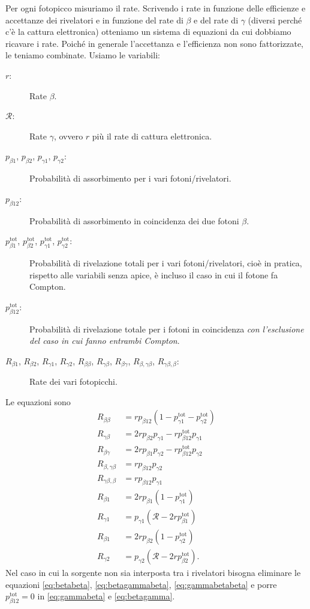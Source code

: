 Per ogni fotopicco misuriamo il rate.
Scrivendo i rate in funzione delle efficienze e accettanze dei rivelatori
e in funzione del rate di $\beta$ e del rate di $\gamma$
(diversi perché c'è la cattura elettronica)
otteniamo un sistema di equazioni da cui dobbiamo ricavare i rate.
Poiché in generale l'accettanza e l'efficienza non sono fattorizzate, le teniamo combinate.
Usiamo le variabili:
\newcommand*\tot{^\text{tot}}
\newcommand*\R{r}
\newcommand*\Rtot{\mathcal{R}}
\begin{description}
	\item[$\R$:]
	Rate $\beta$.
	\item[$\Rtot$:]
	Rate $\gamma$, ovvero $r$ più il rate di cattura elettronica.
	\item[$p_{\beta1}$, $p_{\beta2}$, $p_{\gamma1}$, $p_{\gamma2}$:]
	Probabilità di assorbimento per i vari fotoni/rivelatori.
	\item[$p_{\beta12}$:]
	Probabilità di assorbimento in coincidenza dei due fotoni $\beta$.
	\item[$p_{\beta1}^\text{tot}$, $p_{\beta2}^\text{tot}$, $p_{\gamma1}^\text{tot}$, $p_{\gamma2}^\text{tot}$:]
	Probabilità di rivelazione totali per i vari fotoni/rivelatori,
	cioè in pratica, rispetto alle variabili senza apice, è incluso il caso in cui il fotone fa Compton.
	\item[$p_{\beta12}^\text{tot}$:]
	Probabilità di rivelazione totale per i fotoni in coincidenza
	\emph{con l'esclusione del caso in cui fanno entrambi Compton}.
	\item[$R_{\beta1}$, $R_{\beta2}$, $R_{\gamma1}$, $R_{\gamma2}$, $R_{\beta\beta}$, $R_{\gamma\beta}$, $R_{\beta\gamma}$, $R_{\beta,\gamma\beta}$, $R_{\gamma\beta,\beta}$:]
	Rate dei vari fotopicchi.
\end{description}
Le equazioni sono
\begin{align}
	R_{\beta\beta} \label{eq:betabeta}
	&= \R p_{\beta12} (1 - p_{\gamma1}\tot - p_{\gamma2}\tot) \\
	R_{\gamma\beta} \label{eq:gammabeta}
	&= 2\R p_{\beta2} p_{\gamma1} - \R p_{\beta12}\tot p_{\gamma1} \\
	R_{\beta\gamma} \label{eq:betagamma}
	&= 2\R p_{\beta1} p_{\gamma2} - \R p_{\beta12}\tot p_{\gamma2} \\
	R_{\beta,\gamma\beta} \label{eq:betagammabeta}
	&= \R p_{\beta12} p_{\gamma2} \\
	R_{\gamma\beta,\beta} \label{eq:gammabetabeta}
	&= \R p_{\beta12} p_{\gamma1} \\
	R_{\beta1}
	&= 2\R p_{\beta1} (1 - p_{\gamma1}\tot) \\
	R_{\gamma1} \label{eq:gamma1}
	&= p_{\gamma1}(\Rtot - 2 \R p_{\beta1}\tot) \\
	R_{\beta1}
	&= 2\R p_{\beta2} (1 - p_{\gamma2}\tot) \\
	R_{\gamma2} \label{eq:gamma2}
	&= p_{\gamma2} (\Rtot  - 2 \R p_{\beta2}\tot).
\end{align}
Nel caso in cui la sorgente non sia interposta tra i rivelatori
bisogna eliminare le equazioni \eqref{eq:betabeta}, \eqref{eq:betagammabeta}, \eqref{eq:gammabetabeta}
e porre $p_{\beta12}\tot = 0$ in \eqref{eq:gammabeta} e \eqref{eq:betagamma}.

